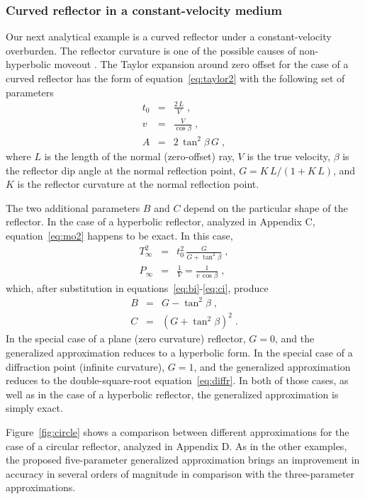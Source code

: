 \subsubsection{Curved reflector in a constant-velocity medium}

Our next analytical example is a curved reflector under a
constant-velocity overburden. The reflector curvature is one of the
possible causes of non-hyperbolic moveout \cite[]{fandg}. The Taylor
expansion around zero offset for the case of a curved reflector has
the form of equation~\ref{eq:taylor2} with the following set of
parameters \cite[]{fomel}
\begin{eqnarray}
\label{eq:ct}
t_0 & = & \frac{2\,L}{V}\;, \\
\label{eq:cv}
v & = & \frac{V}{\cos{\beta}}\;, \\
\label{eq:ca}
A & = & 2\,\tan^2{\beta}\,G\;, 
\end{eqnarray}
where $L$ is the length of the normal (zero-offset) ray, $V$ is the
true velocity, $\beta$ is the reflector dip angle at the normal
reflection point, $G=K\,L/(1+K\,L)$, and $K$ is the reflector
curvature at the normal reflection point. 

The two additional parameters $B$ and $C$ depend on the particular
shape of the reflector. In the case of a hyperbolic reflector,
analyzed in Appendix C, equation~\ref{eq:mo2} happens to be exact. In
this case, 
\begin{eqnarray}
\label{eq:ctinf}
T_{\infty}^2 & = & t_0^2\,\frac{G}{G+\tan^2{\beta}}\;, \\
\label{eq:cpinf}
P_{\infty} & = & \frac{1}{V} =  \frac{1}{v\,\cos{\beta}}\;, 
\end{eqnarray}
which, after substitution in equations~\ref{eq:bi}-\ref{eq:ci}, produce
\begin{eqnarray}
\label{eq:cb}
B & = & G - \tan^2{\beta}\;, \\
\label{eq:cc}
C & = & \left(G + \tan^2{\beta}\right)^2\;.
\end{eqnarray}
In the special case of a plane (zero curvature) reflector, $G=0$, and
the generalized approximation reduces to a hyperbolic form. In the
special case of a diffraction point (infinite curvature), $G=1$, and
the generalized approximation reduces to the double-square-root
equation~\ref{eq:diffr}. In both of those cases, as well as in the
case of a hyperbolic reflector, the generalized approximation is
simply exact.

Figure~\ref{fig:circle} shows a comparison between different
approximations for the case of a circular reflector, analyzed in
Appendix D.  As in the other examples, the proposed five-parameter
generalized approximation brings an improvement in accuracy in several
orders of magnitude in comparison with the three-parameter
approximations.

